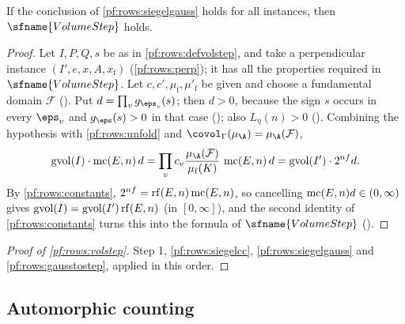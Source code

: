 \begin{lemma}\label{pf:rows:gausstostep}
If the conclusion of \cref{pf:rows:siegelgauss} holds for all instances, then $\sfname{VolumeStep}$ holds.
\end{lemma}

\begin{proof}
Let $I,P,Q,s$ be as in \cref{pf:rows:defvolstep}, and take a perpendicular instance $(I',e,x,A,x_{\mathrm f})$
(\cref{pf:rows:perp}); it has all the properties required in $\sfname{VolumeStep}$. Let $c,c',\mu_{\mathrm f},\mu'_{\mathrm f}$
be given and choose a fundamental domain $\mathcal F$
(). Put $d=\prod_vg_{\eps_v}(s)$; then $d>0$,
because the sign $s$ occurs in every $\eps_v$ and $g_\eps(s)>0$ in that case
(); also $L_\eta(n)>0$
(). Combining the hypothesis with \cref{pf:rows:unfold} and
$\covol_\Gamma(\mu_{\A})=\mu_{\A}(\mathcal F)$,
\[
\rowsgv(I)\cdot\rowsmc(E,n)\,d=\prod_vc_v\frac{\mu_{\A}(\mathcal F)}{\mu_{\mathrm f}(K)}\,\rowsmc(E,n)\,d
=\rowsgv(I')\cdot2^{nf}d .
\]
By \cref{pf:rows:constants}, $2^{nf}=\operatorname{rf}(E,n)\operatorname{mc}(E,n)$, so cancelling $\operatorname{mc}(E,n)d\in(0,\infty)$ gives
$\operatorname{gvol}(I)=\operatorname{gvol}(I')\operatorname{rf}(E,n)$ (in $[0,\infty]$), and the second identity of \cref{pf:rows:constants} turns this
into the formula of $\sfname{VolumeStep}$ ().
\end{proof}

\begin{proof}[Proof of \cref{pf:rows:volstep}]
Step 1, \cref{pf:rows:siegelcc}, \cref{pf:rows:siegelgauss} and \cref{pf:rows:gausstostep}, applied in this order.
\end{proof}

\subsection{Automorphic counting}\label{sec:pf:rows:counting}


